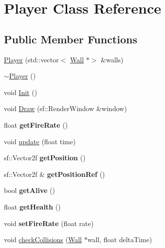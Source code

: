 \hypertarget{class_player}{}\section{Player Class Reference}
\label{class_player}
\subsection*{Public Member Functions}
\begin{DoxyCompactItemize}
\item 
\mbox{\hyperlink{class_player_aa6ba3005051279dc1d45ac615f197ef5}{Player}} (std\+::vector$<$ \mbox{\hyperlink{class_wall}{Wall}} $\ast$$>$ \&walls)
\item 
\mbox{\hyperlink{class_player_a749d2c00e1fe0f5c2746f7505a58c062}{$\sim$\+Player}} ()
\item 
void \mbox{\hyperlink{class_player_a4523bf2e637fcb0e36a3f456ec397e7d}{Init}} ()
\item 
void \mbox{\hyperlink{class_player_a6a0b48c845f9c341283b5fc5a7898f9b}{Draw}} (sf\+::\+Render\+Window \&window)
\item 
\mbox{\label{class_player_ac81962f3fcd0c78c2da40e0bfec9466f}} 
float {\bfseries get\+Fire\+Rate} ()
\item 
void \mbox{\hyperlink{class_player_a194b7082791d882887071d8d2893c5e4}{update}} (float time)
\item 
\mbox{\label{class_player_a23356f99a9de86d3d47eadb679b332dc}} 
sf\+::\+Vector2f {\bfseries get\+Position} ()
\item 
\mbox{\label{class_player_a34f7a992b128e39efd89821a9269b309}} 
sf\+::\+Vector2f \& {\bfseries get\+Position\+Ref} ()
\item 
\mbox{\label{class_player_aa45f751e7ba8afcd9894d57ef4813d50}} 
bool {\bfseries get\+Alive} ()
\item 
\mbox{\label{class_player_a2d1542816021d46bf0d007d57a2c7291}} 
float {\bfseries get\+Health} ()
\item 
\mbox{\label{class_player_a65235f2e8ad1d16ba5826cd21c16aeb5}} 
void {\bfseries set\+Fire\+Rate} (float rate)
\item 
void \mbox{\hyperlink{class_player_ae2d4369f7701288665103149e148a669}{check\+Collisions}} (\mbox{\hyperlink{class_wall}{Wall}} $\ast$wall, float delta\+Time)
$$
\end{DoxyCompactItemize}
